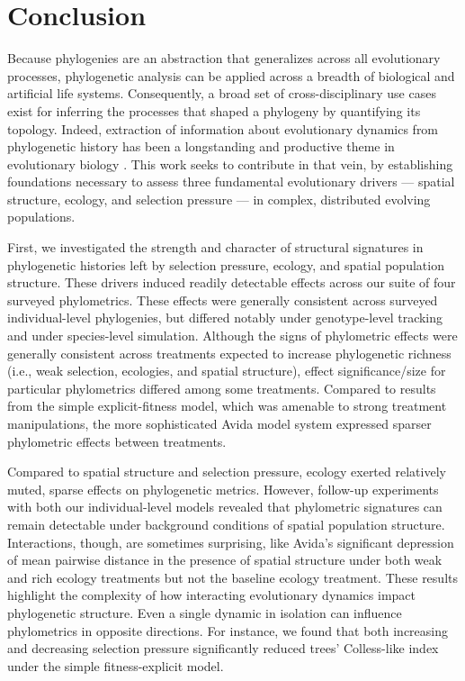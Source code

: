 \section{Conclusion}
\label{sec:conclusion}

Because phylogenies are an abstraction that generalizes across all evolutionary processes, phylogenetic analysis can be applied across a breadth of biological and artificial life systems.
Consequently, a broad set of cross-disciplinary use cases exist for inferring the processes that shaped a phylogeny by quantifying its topology.
Indeed, extraction of information about evolutionary dynamics from phylogenetic history has been a longstanding and productive theme in evolutionary biology \citep{pagel1997inferring}.
This work seeks to contribute in that vein, by establishing foundations necessary to assess three fundamental evolutionary drivers --- spatial structure, ecology, and selection pressure --- in complex, distributed evolving populations.

First, we investigated the strength and character of structural signatures in phylogenetic histories left by selection pressure, ecology, and spatial population structure.
These drivers induced readily detectable effects across our suite of four surveyed phylometrics.
These effects were generally consistent across surveyed individual-level phylogenies, but differed notably under genotype-level tracking and under species-level simulation.
Although the signs of phylometric effects were generally consistent across treatments expected to increase phylogenetic richness (i.e., weak selection, ecologies, and spatial structure), effect significance/size for particular phylometrics differed among some treatments.
Compared to results from the simple explicit-fitness model, which was amenable to strong treatment manipulations, the more sophisticated Avida model system expressed sparser phylometric effects between treatments.

Compared to spatial structure and selection pressure, ecology exerted relatively muted, sparse effects on phylogenetic metrics.
However, follow-up experiments with both our individual-level models revealed that phylometric signatures can remain detectable under background conditions of spatial population structure.
Interactions, though, are sometimes surprising, like Avida's significant depression of mean pairwise distance in the presence of spatial structure under both weak and rich ecology treatments but not the baseline ecology treatment.
These results highlight the complexity of how interacting evolutionary dynamics impact phylogenetic structure.
Even a single dynamic in isolation can influence phylometrics in opposite directions.
For instance, we found that both increasing and decreasing selection pressure significantly reduced trees' Colless-like index under the simple fitness-explicit model.

